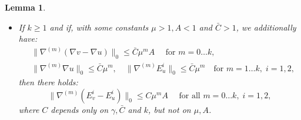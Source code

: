 \documentclass[10pt,a4paper]{amsart}
\newtheorem{lemma}{Lemma}
\newcommand*{\dbar}[1]{\bar{\bar{#1}}}
\newcommand*{\tbar}[1]{\bar{\dbar{#1}}}
\begin{document}
\begin{lemma}
\begin{itemize}
\begin{equation*}
\begin{split}
& \|\nabla^{(m)}(E^2_v-E^2_u)\|_0\\ & \leq C \hspace{-7mm}\sum_{p+\sum_{i=1}^mi(p_i+\bar
  p_i + \dbar p_i+\tbar p_i)=m\hspace{-10mm}} \hspace{-11mm} \|\nabla^{(p)}(\nabla v-\nabla u)\|_0
\prod_{i=1}^m \|\nabla^{(i)}(\nabla v - \nabla u)\|_0^{p_i} \|\nabla^{(i)}\nabla v\|_0^{\bar p_i}
\|\nabla^{(i)}E^1_u\|_0^{\dbar p_i} \|\nabla^{(i)}E^2_u\|_0^{\tbar p_i}.
\end{split}
\end{equation*}
\item[(iii)]  If $k\geq 1$ and if, with some constants $\mu>1, A<1$ and $\bar C>1$, we additionally have:
\begin{equation*}
\begin{split}
& \|\nabla^{(m)}(\nabla v-\nabla u)\|_0\leq \bar C \mu^mA \quad\mbox{ for } m=0\ldots k,
\\ & \|\nabla^{(m)}\nabla u\|_0\leq \bar C\mu^{m}, ~~ \;\;
\|\nabla^{(m)}E^i_u\|_0\leq \bar C\mu^{m}  \quad\mbox{for } m=1\ldots k,\; i=1,2,
\end{split}
\end{equation*}
then there holds:
$$\|\nabla^{(m)}(E^i_v-E^i_u)\|_0\leq C \mu^mA \quad\mbox{ for all }
m=0\ldots k,\; i=1,2,$$
where $C$ depends only on $\gamma, \bar C$ and $k$, but not on $\mu, A$.
\end{itemize}
\end{lemma}
\end{document}
